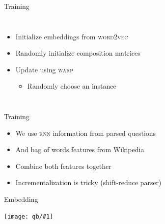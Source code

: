 \documentclass[compress]{beamer}
\newcommand{\gfxq}[2]{
\begin{center}
	\texttt{[image: qb/\#1]}
\end{center}
}
\begin{document}
\begin{frame}{Training}

  \begin{columns}
      \begin{itemize}
        \item Initialize embeddings from \textsc{word2vec}
        \item Randomly initialize composition matrices
        \item Update using \textsc{warp}
          \begin{itemize}
            \item Randomly choose an instance
          \end{itemize}
      \end{itemize}


      \only<1>{\gfxq{warp_training_5}{.8}}
      \only<2>{\gfxq{warp_training_4}{.8}}
      \only<3>{\gfxq{warp_training_3}{.8}}
      \only<4>{\gfxq{warp_training_2}{.8}}
      \only<5>{\gfxq{warp_training_1}{.8}}
      \only<6>{\gfxq{warp_training_0}{.8}}
  \end{columns}

\end{frame}

\begin{frame}{Training}

  \begin{itemize}
    \item We use \textsc{rnn} information from parsed questions
    \item And bag of words features from Wikipedia
    \item Combine both features together
      \pause
    \item Incrementalization is tricky (shift-reduce parser)
  \end{itemize}

\end{frame}

\begin{frame}{Embedding}

  \gfxq{embedding}{1.0}

\end{frame}
\end{document}
